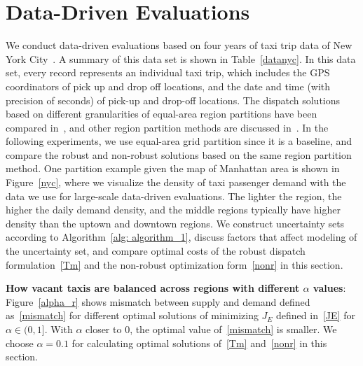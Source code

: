\documentclass[10pt,twocolumn,twoside,english]{IEEEtran}
\begin{document}
\section{Data-Driven Evaluations}
\label{sec:simulation}

We conduct data-driven evaluations based on four years of taxi trip data of New York City~\cite{Dan_nyc}. A summary of this data set is shown in Table~\ref{datanyc}. In this data set, every record represents an individual taxi trip, which includes the GPS coordinators of pick up and drop off locations, and the date and time (with precision of seconds) of pick-up and drop-off locations. The dispatch solutions based on different granularities of equal-area region partitions have been compared in~\cite{Miao_tase16}, and other region partition methods are discussed in~\cite{Miao2017}. In the following experiments, we use equal-area grid partition since it is a baseline, and compare the robust and non-robust solutions based on the same region partition method. One partition example given the map of Manhattan area is shown in Figure~\ref{nyc}, where we visualize the density of taxi passenger demand with the data we use for large-scale data-driven evaluations. The lighter the region, the higher the daily demand density, and the middle regions typically have higher density than the uptown and downtown regions. We construct uncertainty sets according to Algorithm~\ref{alg: algorithm_1}, discuss factors that affect modeling of the uncertainty set, and compare optimal costs of the robust dispatch formulation~\eqref{Tm} and the non-robust optimization form~\eqref{nonr} in this section.   

\textbf{How vacant taxis are balanced across regions with different $\alpha$ values}: Figure~\ref{alpha_r} shows mismatch between supply and demand defined as~\eqref{mismatch} for different optimal solutions of minimizing $J_E$ defined in~\eqref{JE} for $\alpha \in (0,1]$. With $\alpha$ closer to $0$, the optimal value of~\eqref{mismatch} is smaller. We choose $\alpha=0.1$ for calculating optimal solutions of~\eqref{Tm} and~\eqref{nonr} in this section.
\end{document}
